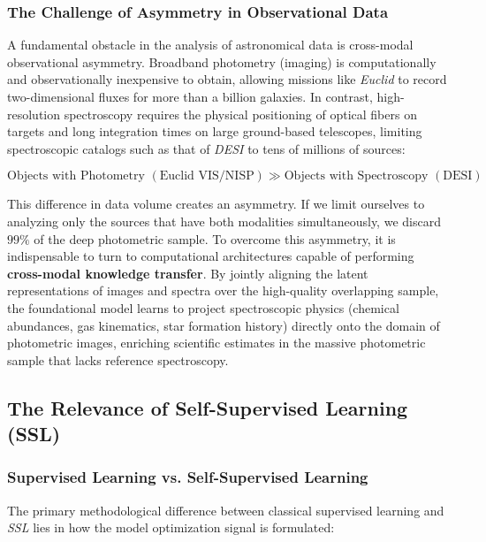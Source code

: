 \subsubsection{The Challenge of Asymmetry in Observational Data}

A fundamental obstacle in the analysis of astronomical data is cross-modal observational asymmetry. Broadband photometry (imaging) is computationally and observationally inexpensive to obtain, allowing missions like \textit{Euclid} to record two-dimensional fluxes for more than a billion galaxies. In contrast, high-resolution spectroscopy requires the physical positioning of optical fibers on targets and long integration times on large ground-based telescopes, limiting spectroscopic catalogs such as that of \textit{\gls{DESI}} \autocite{ar:desi-early-release} to tens of millions of sources:

\begin{equation}
  \text{Objects with Photometry } \left(\text{Euclid VIS/NISP}\right) \gg \text{Objects with Spectroscopy } \left(\text{DESI}\right)
  \label{eq:asimetria_datos}
\end{equation}

This difference in data volume creates an asymmetry. If we limit ourselves to analyzing only the sources that have both modalities simultaneously, we discard $99\%$ of the deep photometric sample. To overcome this asymmetry, it is indispensable to turn to computational architectures capable of performing \textbf{cross-modal knowledge transfer}. By jointly aligning the latent representations of images and spectra over the high-quality overlapping sample, the foundational model learns to project spectroscopic physics (chemical abundances, gas kinematics, star formation history) directly onto the domain of photometric images, enriching scientific estimates in the massive photometric sample that lacks reference spectroscopy.


\subsection{The Relevance of Self-Supervised Learning (SSL)}

\subsubsection{Supervised Learning vs. Self-Supervised Learning} \label{sec:in:versus}

The primary methodological difference between classical supervised learning and \textit{\gls{SSL}} lies in how the model optimization signal is formulated:


